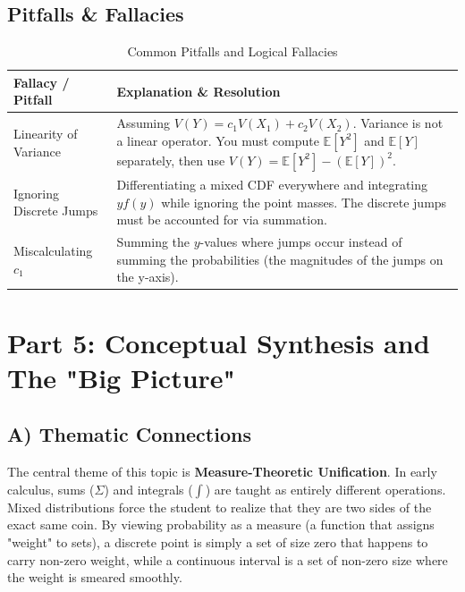 \documentclass[11pt, a4paper]{article}
\theoremstyle{definition}
\theoremstyle{remark}
\newcommand{\E}{\mathbb{E}}
\begin{document}
\subsection{Pitfalls \& Fallacies}
\begin{table}[htbp]
\centering
\renewcommand{\arraystretch}{1.5}
\begin{tabularx}{\textwidth}{@{} l X @{}}
\toprule
\textbf{Fallacy / Pitfall} & \textbf{Explanation \& Resolution} \\
\midrule
Linearity of Variance & Assuming $V(Y) = c_1 V(X_1) + c_2 V(X_2)$. Variance is not a linear operator. You must compute $\E[Y^2]$ and $\E[Y]$ separately, then use $V(Y) = \E[Y^2] - (\E[Y])^2$. \\
Ignoring Discrete Jumps & Differentiating a mixed CDF everywhere and integrating $y f(y)$ while ignoring the point masses. The discrete jumps must be accounted for via summation. \\
Miscalculating $c_1$ & Summing the $y$-values where jumps occur instead of summing the probabilities (the magnitudes of the jumps on the y-axis). \\
\bottomrule
\end{tabularx}
\caption{Common Pitfalls and Logical Fallacies}
\end{table}

\newpage
\section{Part 5: Conceptual Synthesis and The "Big Picture"}

\subsection{A) Thematic Connections}
The central theme of this topic is \textbf{Measure-Theoretic Unification}. In early calculus, sums ($\Sigma$) and integrals ($\int$) are taught as entirely different operations. Mixed distributions force the student to realize that they are two sides of the exact same coin. By viewing probability as a measure (a function that assigns "weight" to sets), a discrete point is simply a set of size zero that happens to carry non-zero weight, while a continuous interval is a set of non-zero size where the weight is smeared smoothly. 
\end{document}
